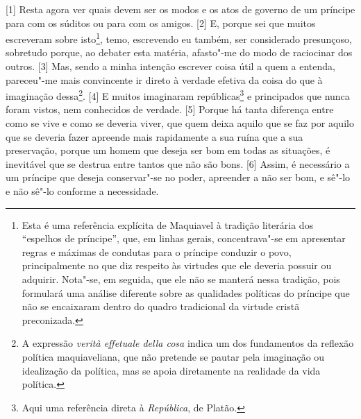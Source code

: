 {[}1{]} Resta agora ver quais devem ser os modos e os atos de governo de
um príncipe para com os súditos ou para com os amigos. {[}2{]} E, porque
sei que muitos escreveram sobre isto\footnote{Esta é uma referência
  explícita de Maquiavel à tradição literária dos ``espelhos de
  príncipe'', que, em linhas gerais, concentrava"-se em apresentar regras
  e máximas de condutas para o príncipe conduzir o povo, principalmente
  no que diz respeito às virtudes que ele deveria possuir ou adquirir.
  Nota"-se, em seguida, que ele não se manterá nessa tradição, pois
  formulará uma análise diferente sobre as qualidades políticas do
  príncipe que não se encaixaram dentro do quadro tradicional da virtude
  cristã preconizada.}, temo, escrevendo eu também, ser considerado
presunçoso, sobretudo porque, ao debater esta matéria, afasto"-me do modo
de raciocinar dos outros. {[}3{]} Mas, sendo a minha intenção escrever
coisa útil a quem a entenda, pareceu"-me mais convincente ir direto à
verdade efetiva da coisa do que à imaginação dessa\footnote{A expressão
  \emph{verità effetuale della cosa} indica um dos fundamentos da
  reflexão política maquiaveliana, que não pretende se pautar pela
  imaginação ou idealização da política, mas se apoia diretamente na
  realidade da vida política.}. {[}4{]} E muitos imaginaram
repúblicas\footnote{Aqui uma referência direta à \emph{República}, de
  Platão.} e principados que nunca foram vistos, nem conhecidos de
verdade. {[}5{]} Porque há tanta diferença entre como se vive e como se
deveria viver, que quem deixa aquilo que se faz por aquilo que se
deveria fazer apreende mais rapidamente a sua ruína que a sua
preservação, porque um homem que deseja ser bom em todas as situações, é
inevitável que se destrua entre tantos que não são bons. {[}6{]} Assim,
é necessário a um príncipe que deseja conservar"-se no poder, apreender a
não ser bom, e sê"-lo e não sê"-lo conforme a necessidade.

